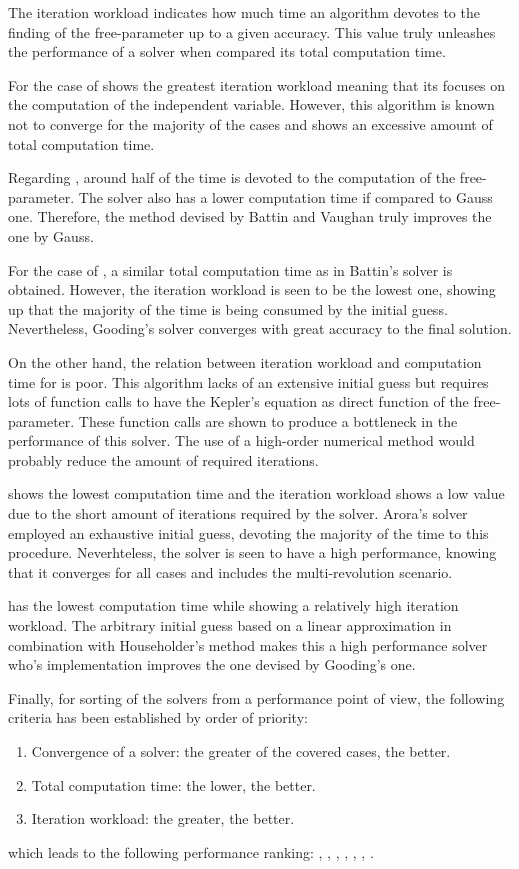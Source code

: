 The iteration workload indicates how much time an algorithm devotes to the
finding of the free-parameter up to a given accuracy. This value truly unleashes
the performance of a solver when compared its total computation time. 

For the case of \cite{gauss1809} shows the greatest iteration workload meaning that
its focuses on the computation of the independent variable. However, this
algorithm is known not to converge for the majority of the cases and shows an
excessive amount of total computation time.

Regarding \cite{battin1984}, around half of the time is devoted to the
computation of the free-parameter. The solver also has a lower computation time
if compared to Gauss one. Therefore, the method devised by Battin and Vaughan
truly improves the one by Gauss.

For the case of \cite{gooding1990}, a similar total computation time as in
Battin's solver is obtained. However, the iteration workload is seen to be the
lowest one, showing up that the majority of the time is being consumed by the
initial guess. Nevertheless, Gooding's solver converges with great accuracy to
the final solution.

On the other hand, the relation between iteration workload and computation time
for \cite{avanzini2008} is poor. This algorithm lacks of an extensive initial
guess but requires lots of function calls to have the Kepler's equation as
direct function of the free-parameter. These function calls are shown to produce
a bottleneck in the performance of this solver. The use of a high-order
numerical method would probably reduce the amount of required iterations.

\cite{arora2013} shows the lowest computation time and the iteration workload
shows a low value due to the short amount of iterations required by the solver.
Arora's solver employed an exhaustive initial guess, devoting the majority of
the time to this procedure. Neverhteless, the solver is seen to have a high
performance, knowing that it converges for all cases and includes the
multi-revolution scenario. 

\cite{izzo2015} has the lowest computation time while showing a
relatively high iteration workload. The arbitrary initial guess based on a
linear approximation in combination with Householder's method makes this a high
performance solver who's implementation improves the one devised by Gooding's one.

Finally, for sorting of the solvers from a performance point of view, the
following criteria has been established by order of priority:

\begin{enumerate}
  \item Convergence of a solver: the greater of the covered cases, the better.
  \item Total computation time: the lower, the better.
  \item Iteration workload: the greater, the better.
\end{enumerate}

which leads to the following performance ranking: \cite{izzo2015},
\cite{arora2013}, \cite{gooding1990}, \cite{battin1984}, \cite{avanzini2008},
\cite{vallado2013}, \cite{gauss1809}.
